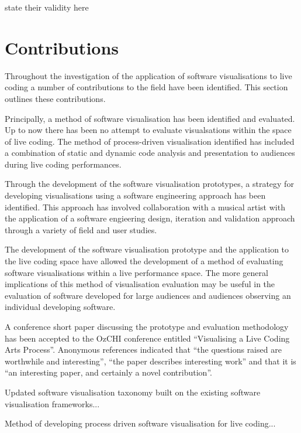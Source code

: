 {\color{red} state their validity here}

\section{Contributions}

Throughout the investigation of the application of software visualisations to live coding a number of contributions to the field have been identified. This section outlines these contributions.

Principally, a method of software visualisation has been identified and evaluated. Up to now there has been no attempt to evaluate visualsations within the space of live coding. The method of process-driven visualisation identified has included a combination of static and dynamic code analysis and presentation to audiences during live coding performances.

Through the development of the software visualisation prototypes, a strategy for developing visualisations using a software engineering approach has been identified. This approach has involved collaboration with a musical artist with the application of a software engieering design, iteration and validation approach through a variety of field and user studies.

The development of the software visualisation prototype and the application to the live coding space have allowed the development of a method of evaluating software visualisations within a live performance space. The more general implications of this method of visualisation evaluation may be useful in the evaluation of software developed for large audiences and audiences observing an individual developing software.

A conference short paper discussing the prototype and evaluation methodology has been accepted to the OzCHI conference entitled ``Visualising a Live Coding Arts Process''. Anonymous references indicated that ``the questions raised are worthwhile and interesting'', ``the paper describes interesting work'' and that it is ``an interesting paper, and certainly a novel contribution''.


Updated software visualisation taxonomy built on the existing software visualisation frameworks...

Method of developing process driven software visualisation for live coding...

